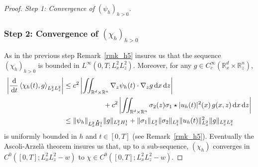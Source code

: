 \documentclass[JEP,XML,SOM,NoEqCountersInSection,NoFloatCountersInSection,Unicode,published]{cedram}
\theoremstyle{definition}
\newcommand*{\overbigdot}[1]{%
\accentset{\mbox{\large\bfseries .}}{#1}}
\newcommand{\R}{\mathbb{R}}
\newcommand{\ud}{\, {\mathrm{d}}}
\begin{document}
\begin{proof}[Proof. Step 1: Convergence of $(\psi_{h})_{h>0}$]
\subsubsection*{Step 2: Convergence of $(\chi_{h})_{h>0}$} As in the previous step Remark~\ref{rmk_h5} insures us that the sequence $(\chi_{h})_{h>0}$ is bounded in $L^{\infty}(0,T;L_{x}^{2}L_{z}^{2})$. Moreover, for any $g\in C_{c}^{\infty}(\R_{x}^{d}\times\R_{z}^{n})$,
\begin{align*}
\left|\frac{\ud}{\ud t}\left\langle\chi_{h}(t),g\right\rangle_{L_{x}^{2}L_{z}^{2}}\right|
&\leq c^{2}\left|\iint_{\R^{d}\times\R^{n}}\nabla_{z}\psi_{h}(t)\cdot\nabla_{z}g\ud x\ud z\right|\\
&\hspace*{2cm}+c^{2}\left|\iint_{\R^{d}\times\R^{n}}\sigma_{2}(z)\sigma_{1}\star|u_{h}(t)|^{2}(x)\,g(x,z)\ud x\ud z\right|\\
&\leq\|\psi_{h}\|_{L_{x}^{2}\overbigdot{H}_{z}^{1}}\|g\|_{L_{x}^{2}H_{z}^{1}}+\|\sigma_{1}\|_{L_{x}^{2}}\|\sigma_{2}\|_{L_{z}^{2}}\|u_{h}(t)\|_{L_{x}^{2}}^{2}\|g\|_{L_{x}^{2}L_{z}^{2}}
\end{align*}
is uniformly bounded in $h$ and $t\in[0,T]$ (see Remark~\ref{rmk_h5}). Eventually the Ascoli-Arzelà theorem insures us that, up to a sub-sequence, $(\chi_{h})$ converges in $C^{0}([0,T];L_{x}^{2}L_{z}^{2}-w)$ to $\chi\in C^{0}([0,T];L_{x}^{2}L_{z}^{2}-w)$.


\end{proof}
\end{document}
